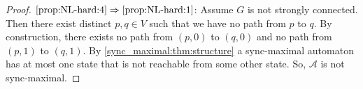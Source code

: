 \begin{proof}
	$\ref{prop:NL-hard:4} \Rightarrow \ref{prop:NL-hard:1}$:  Assume $G$ is not strongly connected.
	Then there exist distinct $p,q \in V$ such that we have no path from $p$ to $q$.
	By construction, there exists no path from $(p,0)$ to $(q,0)$
	and no path from $(p,1)$ to $(q,1)$.
	By \cref{sync_maximal:thm:structure}
	a sync-maximal automaton has at most one state
	that is not reachable from some other state.
	So, $\mathcal A$ is not sync-maximal.   

\end{proof}

